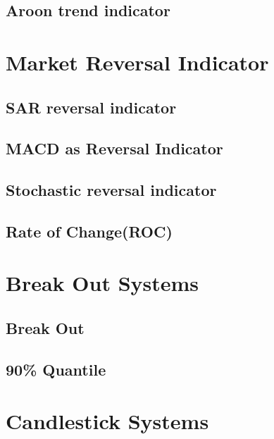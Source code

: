 \subsection{Aroon trend indicator}
\label{appA:aroon}


\section{Market Reversal Indicator}
\subsection{SAR reversal indicator}
\label{appA:sar}


\subsection{MACD as Reversal Indicator}
\label{appA:macd_ob}

\subsection{Stochastic reversal indicator}
\label{appA:stoch}


\subsection{Rate of Change(ROC)}
\label{appA:roc}


\section{Break Out Systems}
\subsection{Break Out}
\label{appA:bout_sys}


\subsection{90\% Quantile}


\label{appA:bout_Quant90}

\section{Candlestick Systems}
